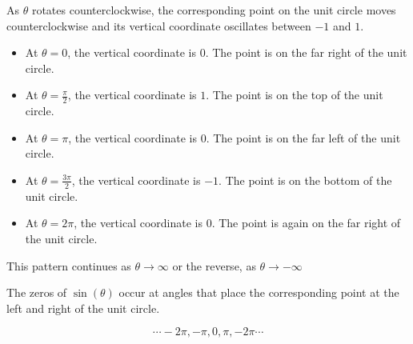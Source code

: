\documentclass{ximera}
\begin{document}
\begin{image}
\end{image}



As $\theta$ rotates counterclockwise, the corresponding point on the unit circle moves counterclockwise and its vertical coordinate oscillates between $-1$ and $1$.

\begin{itemize}
\item At $\theta = 0$, the vertical coordinate is $0$. The point is on the far right of the unit circle.
\item At $\theta = \frac{\pi}{2}$, the vertical coordinate is $1$. The point is on the top of the unit circle.
\item At $\theta = \pi$, the vertical coordinate is $0$. The point is on the far left of the unit circle.
\item At $\theta = \frac{3\pi}{2}$, the vertical coordinate is $-1$. The point is on the bottom of the unit circle.
\item At $\theta = 2\pi$, the vertical coordinate is $0$. The point is again on the far right of the unit circle.
\end{itemize}


This pattern continues as $\theta \rightarrow \infty$ or the reverse, as $\theta \rightarrow -\infty$

The zeros of $\sin(\theta)$ occur at angles that place the corresponding point at the left and right of the unit circle.  


\[     \cdots -2\pi, -\pi, 0, \pi, -2\pi \cdots \]
\end{document}
